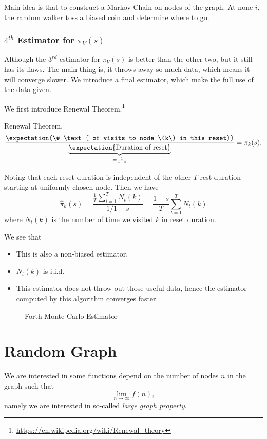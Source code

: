 \begin{prev}
	Main idea is that to construct a Markov Chain on nodes of the graph. At none \(i\), the random walker toss a biased coin and
	determine where to go.
\end{prev}

\subsubsection{\(4^{th}\) Estimator for \(\pi_V(s)\)}
Although the \(3^{rd}\) estimator for \(\pi_V(s)\) is better than the other two, but it still has its flaws. The main thing is, it throws away so much
data, which means it will converge slower. We introduce a final estimator, which make the full use of the data given.

We first introduce Renewal Theorem.\footnote{\url{https://en.wikipedia.org/wiki/Renewal_theory}}
\begin{theorem}
	Renewal Theorem.
	\[
		\frac{\expectation{\# \text{ of visits to node \(k\) in this reset}} }{\underbrace{\expectation{\text{Duration of reset}}}_{= \frac{1}{1-s}}} = \pi_k(s).
	\]

	Noting that each reset duration is independent of the other \(T\) rest duration starting at uniformly chosen node. Then we have
	\[
		\hat{\pi}_k(s) = \frac{\frac{1}{T}\sum\limits_{i=1}^{T} N_t(k)}{1/1-s} = \frac{1-s}{T}\sum\limits_{t=1}^{T} N_t(k)
	\]
	where \(N_t(k)\) is the number of time we visited \(k\) in reset duration.
\end{theorem}

\begin{remark}
	We see that
	\begin{itemize}
		\item This is also a non-biased estimator.
		\item \(N_t(k)\) is i.i.d.
		\item This estimator does not throw out those useful data, hence the estimator computed by this algorithm converges faster.
	\end{itemize}
\end{remark}

\begin{figure}[H]
	\centering
	\caption{Forth Monte Carlo Estimator}
	\label{fig:Monte-Carlo-Estimator-4}
\end{figure}

\section{Random Graph}
We are interested in some functions depend on the number of nodes \(n\) in the graph such that
\[
	\lim_{n\to \infty }f(n),
\]
namely we are interested in so-called \emph{large graph property}.
